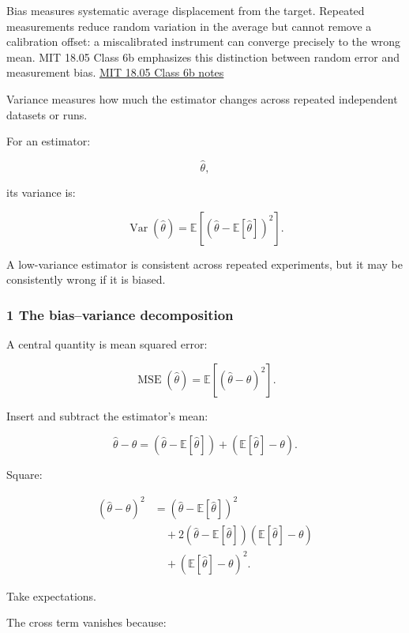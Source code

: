 Bias measures systematic average displacement from the target. Repeated measurements reduce random variation in the average but cannot remove a calibration offset: a miscalibrated instrument can converge precisely to the wrong mean. MIT 18.05 Class 6b emphasizes this distinction between random error and measurement bias. \href{https://ocw.mit.edu/courses/18-05-introduction-to-probability-and-statistics-spring-2022/mit18_05_s22_classC0-prep-b.pdf}{MIT 18.05 Class 6b notes}

Variance measures how much the estimator changes across repeated independent datasets or runs.

For an estimator:

\[
 \widehat\theta,
\]

its variance is:

\[
 \boxed{ \operatorname{Var}(\widehat\theta) = \mathbb E[ (\widehat\theta-\mathbb E[\widehat\theta])^2 ] }.
\]

A low-variance estimator is consistent across repeated experiments, but it may be consistently wrong if it is biased.

\subsubsection{1 The bias--variance decomposition}\label{02-foundations-ii-ch030-the-biasvariance-decomposition}

\hypertarget{02-foundations-ii-ch030-the-biasvariance-decomposition}{}

A central quantity is mean squared error:

\[
 \operatorname{MSE}(\widehat\theta) = \mathbb E[(\widehat\theta-\theta)^2].
\]

Insert and subtract the estimator's mean:

\[
 \widehat\theta-\theta = (\widehat\theta-\mathbb E[\widehat\theta]) + (\mathbb E[\widehat\theta]-\theta).
\]

Square:

\[
 \begin{aligned} (\widehat\theta-\theta)^2 &= (\widehat\theta-\mathbb E[\widehat\theta])^2\\ &\quad+ 2(\widehat\theta-\mathbb E[\widehat\theta]) (\mathbb E[\widehat\theta]-\theta)\\ &\quad+ (\mathbb E[\widehat\theta]-\theta)^2. \end{aligned}
\]

Take expectations.

The cross term vanishes because:

